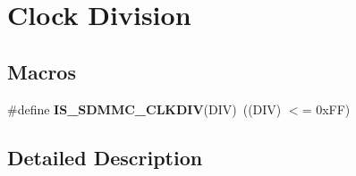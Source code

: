 \hypertarget{group___s_d_m_m_c___l_l___clock___division}{}\section{Clock Division}
\label{group___s_d_m_m_c___l_l___clock___division}
\subsection*{Macros}
\begin{DoxyCompactItemize}
\item 
\mbox{\label{group___s_d_m_m_c___l_l___clock___division_ga6d7885567fc5c815dfabf24792d75d10}} 
\#define {\bfseries I\+S\+\_\+\+S\+D\+M\+M\+C\+\_\+\+C\+L\+K\+D\+IV}(D\+IV)~((D\+IV) $<$= 0x\+F\+F)
\end{DoxyCompactItemize}


\subsection{Detailed Description}

